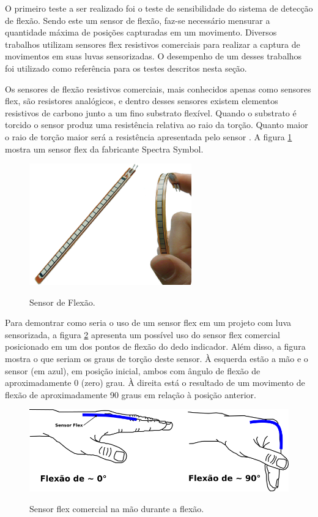 \documentclass[
	12pt,				%
	openright,			%
	oneside,			%
	a4paper,			%
	english,			%
	brazil				%
	]{abntex2}
\begin{document}
		O primeiro teste a ser realizado foi o teste de sensibilidade do sistema de detecção de flexão. Sendo este um sensor de flexão, faz-se necessário mensurar a quantidade máxima de posições capturadas em um movimento. Diversos trabalhos utilizam sensores flex resistivos comerciais para realizar a captura de movimentos em suas luvas sensorizadas. O desempenho de um desses trabalhos foi utilizado como referência para os testes descritos nesta seção.

		Os sensores de flexão resistivos comerciais, mais conhecidos apenas como sensores flex, são resistores analógicos, e dentro desses sensores existem elementos resistivos de carbono junto a um fino substrato flexível. Quando o substrato é torcido o sensor produz uma resistência relativa ao raio da torção. Quanto maior o raio de torção maior será a resistência apresentada pelo sensor \cite{solanki2013sign}. A figura \ref{Fig:flex-sensor1} mostra um sensor flex da fabricante Spectra Symbol.

	\begin{figure}[!h]
		\centering
		\caption{Sensor de Flexão.}
		\includegraphics[width=7cm,keepaspectratio=true]{./figures/flex-sensor1.png}
		\label{Fig:flex-sensor1}
	\end{figure}


		Para demontrar como seria o uso de um sensor flex em um projeto com luva sensorizada, a figura \ref{Fig:hand-flexsensor-degrees1} apresenta um possível uso do sensor flex comercial posicionado em um dos pontos de flexão do dedo indicador. Além disso, a figura mostra o que seriam os graus de torção deste sensor. À esquerda estão a mão e o sensor (em azul), em posição inicial, ambos com ângulo de flexão de aproximadamente 0 (zero) grau. À direita está o resultado de um movimento de flexão de aproximadamente 90 graus em relação à posição anterior.


	\begin{figure}[!h]
		\centering
		\caption{Sensor flex comercial na mão durante a flexão.}
		\includegraphics[width=13cm,keepaspectratio=true]{./figures/hand-flexsensor-degrees1.png}
		\label{Fig:hand-flexsensor-degrees1}
	\end{figure}
\end{document}
